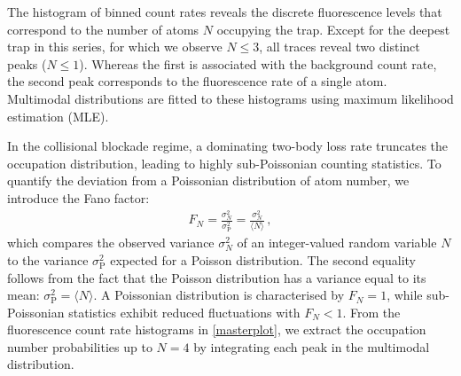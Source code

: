 \documentclass[../Thesis-IJspeert.tex]{subfiles}
\begin{document}
The histogram of binned count rates reveals the discrete fluorescence levels that correspond to the number of atoms $N$ occupying the trap. Except for the deepest trap in this series, for which we observe $N\le3$, all traces reveal two distinct peaks ($N\le1$). Whereas the first is associated with the background count rate, the second peak corresponds to the fluorescence rate of a single atom. Multimodal distributions are fitted to these histograms using maximum likelihood estimation (MLE).

In the collisional blockade regime, a dominating two-body loss rate truncates the occupation distribution, leading to highly sub-Poissonian counting statistics. To quantify the deviation from a Poissonian distribution of atom number, we introduce the Fano factor:
\begin{align}
F_N = \frac{\sigma_N^2}{\sigma^2_{\mathrm{P}}} = \frac{\sigma_N^2}{\langle{N}\rangle}\,,
\end{align}
which compares the observed variance $\sigma^2_{N}$ of an integer-valued random variable $N$ to the variance $\sigma^2_{\mathrm{P}}$ expected for a Poisson distribution. The second equality follows from the fact that the Poisson distribution has a variance equal to its mean: $ \sigma^2_{\mathrm{P}} = \langle{N}\rangle $. A Poissonian distribution is characterised by $F_N=1$, while sub-Poissonian statistics exhibit reduced fluctuations with $F_N<1$. From the fluorescence count rate histograms in \autoref{masterplot}, we extract the occupation number probabilities up to $N=4$ by integrating each peak in the multimodal distribution.
\end{document}
